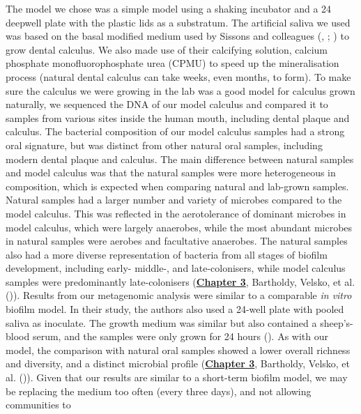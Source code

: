 \documentclass[
  b5paper,
]{book}
\begin{document}
The model we chose was a simple model using a shaking incubator and a 24
deepwell plate with the plastic lids as a substratum. The artificial
saliva we used was based on the basal modified medium used by Sissons
and colleagues (,
;
) to grow dental
calculus. We also made use of their calcifying solution, calcium
phosphate monofluorophosphate urea (CPMU) to speed up the mineralisation
process (natural dental calculus can take weeks, even months, to form).
To make sure the calculus we were growing in the lab was a good model
for calculus grown naturally, we sequenced the DNA of our model calculus
and compared it to samples from various sites inside the human mouth,
including dental plaque and calculus. The bacterial composition of our
model calculus samples had a strong oral signature, but was distinct
from other natural oral samples, including modern dental plaque and
calculus. The main difference between natural samples and model calculus
was that the natural samples were more heterogeneous in composition,
which is expected when comparing natural and lab-grown samples. Natural
samples had a larger number and variety of microbes compared to the
model calculus. This was reflected in the aerotolerance of dominant
microbes in model calculus, which were largely anaerobes, while the most
abundant microbes in natural samples were aerobes and facultative
anaerobes. The natural samples also had a more diverse representation of
bacteria from all stages of biofilm development, including early-
middle-, and late-colonisers, while model calculus samples were
predominantly late-colonisers (\hyperref[byoc-valid]{\textbf{Chapter
3}}, Bartholdy, Velsko, et al.
()). Results from our
metagenomic analysis were similar to a comparable \emph{in vitro}
biofilm model. In their study, the authors also used a 24-well plate
with pooled saliva as inoculate. The growth medium was similar but also
contained a sheep's-blood serum, and the samples were only grown for 24
hours ().
As with our model, the comparison with natural oral samples showed a
lower overall richness and diversity, and a distinct microbial profile
(\hyperref[byoc-valid]{\textbf{Chapter 3}}, Bartholdy, Velsko, et al.
()). Given that our
results are similar to a short-term biofilm model, we may be replacing
the medium too often (every three days), and not allowing communities to
\end{document}
